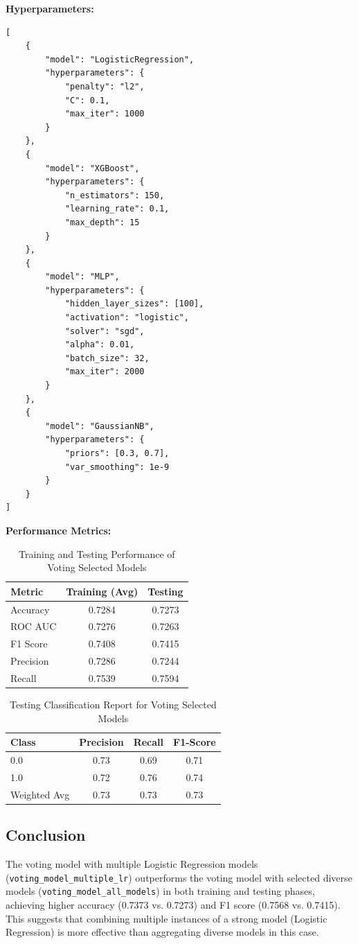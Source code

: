 \textbf{Hyperparameters:}
\begin{verbatim}
[
    {
        "model": "LogisticRegression",
        "hyperparameters": {
            "penalty": "l2",
            "C": 0.1,
            "max_iter": 1000
        }
    },
    {
        "model": "XGBoost",
        "hyperparameters": {
            "n_estimators": 150,
            "learning_rate": 0.1,
            "max_depth": 15
        }
    },
    {
        "model": "MLP",
        "hyperparameters": {
            "hidden_layer_sizes": [100],
            "activation": "logistic",
            "solver": "sgd",
            "alpha": 0.01,
            "batch_size": 32,
            "max_iter": 2000
        }
    },
    {
        "model": "GaussianNB",
        "hyperparameters": {
            "priors": [0.3, 0.7],
            "var_smoothing": 1e-9
        }
    }
]
\end{verbatim}

\textbf{Performance Metrics:}
\begin{table}[H]
\centering
\caption{Training and Testing Performance of Voting Selected Models}
\begin{tabular}{|l|c|c|}
\hline
\textbf{Metric} & \textbf{Training (Avg)} & \textbf{Testing} \\ \hline
Accuracy & 0.7284 & 0.7273 \\ \hline
ROC AUC & 0.7276 & 0.7263 \\ \hline
F1 Score & 0.7408 & 0.7415 \\ \hline
Precision & 0.7286 & 0.7244 \\ \hline
Recall & 0.7539 & 0.7594 \\ \hline
\end{tabular}
\end{table}

\begin{table}[H]
\centering
\caption{Testing Classification Report for Voting Selected Models}
\begin{tabular}{|l|c|c|c|}
\hline
\textbf{Class} & \textbf{Precision} & \textbf{Recall} & \textbf{F1-Score} \\ \hline
0.0 & 0.73 & 0.69 & 0.71 \\ \hline
1.0 & 0.72 & 0.76 & 0.74 \\ \hline
Weighted Avg & 0.73 & 0.73 & 0.73 \\ \hline
\end{tabular}
\end{table}

\subsection{Conclusion}
The voting model with multiple Logistic Regression models (\texttt{voting\_model\_multiple\_lr}) outperforms the voting model with selected diverse models (\texttt{voting\_model\_all\_models}) in both training and testing phases, achieving higher accuracy (0.7373 vs. 0.7273) and F1 score (0.7568 vs. 0.7415). This suggests that combining multiple instances of a strong model (Logistic Regression) is more effective than aggregating diverse models in this case.
